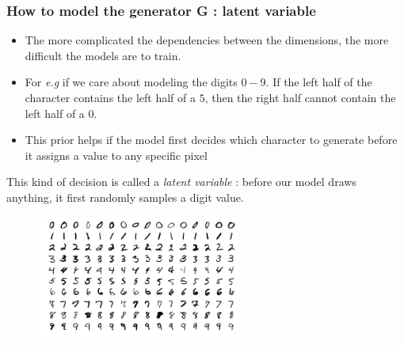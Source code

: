 \documentclass[french,9pt]{beamer}
\begin{document}
\begin{frame}
\frametitle{How to model the generator G : latent variable }

\begin{itemize}
\item The more complicated the dependencies between the dimensions, the more difficult the models are to train. 
\pause
\item For \textit{e.g} if we care about modeling the digits $0-9$. If the left half of the character contains the left half of a $5$, then the right half cannot contain the left half of a $0$.
\pause
\item This prior helps if the model first decides which character to generate before it assigns a value to any specific pixel
\end{itemize}

\pause
This kind of decision is called a \emph{latent variable} : before our model draws anything, it first randomly samples a digit value.

\begin{figure}
  \begin{center}
    \includegraphics[width=0.6\textwidth]{fig/mnist.png}
  \end{center}
\end{figure}

\end{frame}

\end{document}
